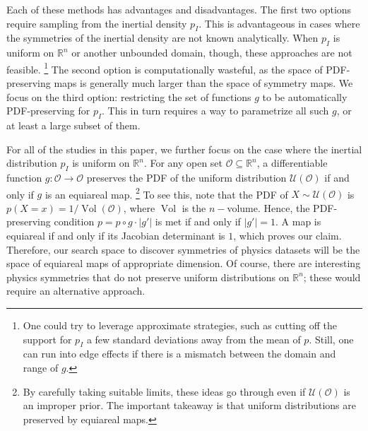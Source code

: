 \documentclass[aps,prx,reprint,preprintnumbers,superscriptaddress,nofootinbib,longbibliography,floatfix]{revtex4-1}
\newcommand{\R}{\mathbb{R}}
\renewcommand{\O}{\mathcal{O}}
\newcommand{\U}{\mathcal{U}}
\begin{document}
Each of these methods has advantages and disadvantages.
%
The first two options require sampling from the inertial density $p_I$.
%
This is advantageous in cases where the symmetries of the inertial density are not known analytically.
%
When $p_I$ is uniform on $\mathbb{R}^n$ or another unbounded domain, though, these approaches are not feasible.%
%
\footnote{One could try to leverage approximate strategies, such as cutting off the support for $p_I$ a few standard deviations away from the mean of $p$.  Still, one can run into edge effects if there is a mismatch between the domain and range of $g$.}
%
The second option is computationally wasteful, as the space of PDF-preserving maps is generally much larger than the space of symmetry maps.
%
We focus on the third option: restricting the set of functions $g$ to be automatically PDF-preserving for $p_I$.
%
This in turn requires a way to parametrize all such $g$, or at least a large subset of them.

For all of the studies in this paper, we further focus on the case where the inertial distribution $p_I$ is uniform on $\mathbb{R}^n$.
%
For any open set $\O\subseteq\R^n$, a differentiable function $g:\O\to \O$ preserves the PDF of the uniform distribution $\U(\O)$ if and only if $g$ is an equiareal map.%
%
\footnote{By carefully taking suitable limits, these ideas go through even if $\U(\O)$ is an improper prior. The important takeaway is that uniform distributions are preserved by equiareal maps.}
%
To see this, note that the PDF of $X\sim\U(\O)$ is $p(X = x) = 1/\operatorname{Vol}(\O)$, where $\operatorname{Vol}$ is the $n-$volume.
%
Hence, the PDF-preserving condition $p = p\circ g\cdot |g'|$ is met if and only if $|g'| = 1$.
%
A map is equiareal if and only if its Jacobian determinant is $1$, which proves our claim.
%
Therefore, our search space to discover symmetries of physics datasets will be the space of equiareal maps of appropriate dimension.
%
Of course, there are interesting physics symmetries that do not preserve uniform distributions on $\mathbb{R}^n$; these would require an alternative approach.
\end{document}
